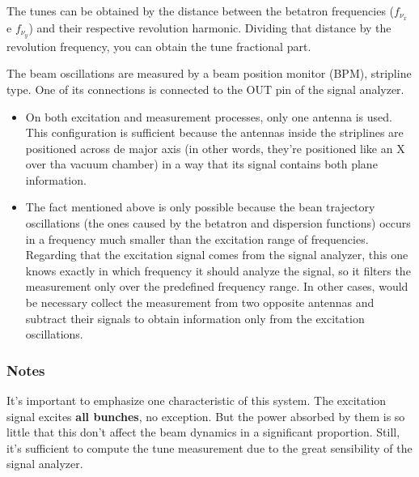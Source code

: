 The tunes can be obtained by the distance between the betatron frequencies ($f_{\nu_x}$ e $f_{\nu_y}$) and their respective revolution harmonic. Dividing that distance by the revolution frequency, you can obtain the tune fractional part.

The beam oscillations are measured by a beam position monitor (BPM), stripline type. One of its connections is connected to the OUT pin of the signal analyzer.

\begin{itemize}
	\item On both excitation and measurement processes, only one antenna is used. This configuration is sufficient because the antennas inside the striplines are positioned across de major axis (in other words, they're positioned like an X over tha vacuum chamber) in a way that its signal contains both plane information.
	\item The fact mentioned above is only possible because the bean trajectory oscillations (the ones caused by the betatron and dispersion functions) occurs in a frequency much smaller than the excitation range of frequencies. Regarding that the excitation signal comes from the signal analyzer, this one knows exactly in which frequency it should analyze the signal, so it filters the measurement only over the predefined frequency range. In other cases, would be necessary collect the measurement from two opposite antennas and subtract their signals to obtain information only from the excitation oscillations.
\end{itemize}

\subsubsection{Notes}
It's important to emphasize one characteristic of this system. The excitation signal excites \textbf{all bunches}, no exception. But the power absorbed by them is so little that this don't affect the beam dynamics in a significant proportion. Still, it's sufficient to compute the tune measurement due to the great sensibility of the signal analyzer.